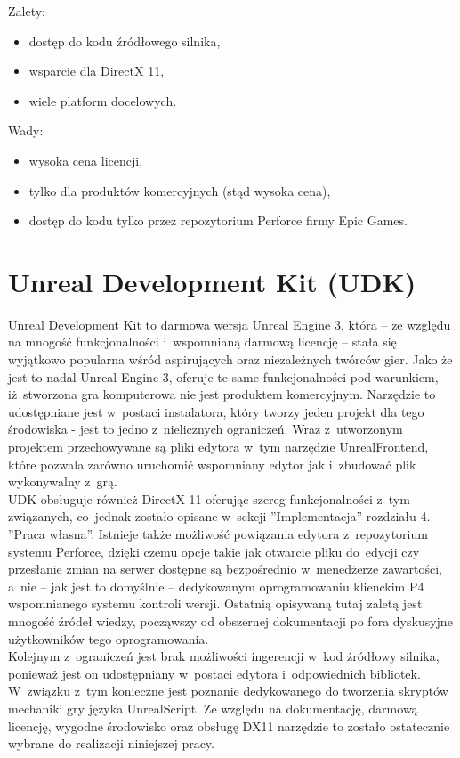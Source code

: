{\raggedright Zalety:
\begin{itemize}
\item dostęp do kodu źródłowego silnika,
\item wsparcie dla DirectX 11,
\item wiele platform docelowych.
\end{itemize}

Wady:
\begin{itemize}
\item wysoka cena licencji,
\item tylko dla produktów komercyjnych (stąd wysoka cena),
\item dostęp do kodu tylko przez repozytorium Perforce firmy Epic Games.
\end{itemize}
}

\section{Unreal Development Kit (UDK)}

Unreal Development Kit to darmowa wersja Unreal Engine 3, która -- ze względu na mnogość funkcjonalności i~wspomnianą darmową licencję -- stała się wyjątkowo popularna wśród aspirujących oraz niezależnych twórców gier. Jako że jest to nadal Unreal Engine 3, oferuje te same funkcjonalności pod warunkiem, iż~stworzona gra komputerowa nie jest produktem komercyjnym. Narzędzie to udostępniane jest w~postaci instalatora, który tworzy jeden projekt dla tego środowiska - jest to jedno z~nielicznych ograniczeń. Wraz z~utworzonym projektem przechowywane są pliki edytora w~tym narzędzie UnrealFrontend, które pozwala zarówno uruchomić wspomniany edytor jak i~zbudować plik wykonywalny z~grą.\\
UDK obsługuje również DirectX 11 oferując szereg funkcjonalności z~tym związanych, co~jednak zostało opisane w~sekcji ''Implementacja'' rozdziału 4. ''Praca własna''. Istnieje także możliwość powiązania edytora z~repozytorium systemu Perforce, dzięki czemu opcje takie jak otwarcie pliku do~edycji czy przesłanie zmian na serwer dostępne są bezpośrednio w~menedżerze zawartości, a~nie -- jak jest to domyślnie -- dedykowanym oprogramowaniu klienckim P4 wspomnianego systemu kontroli wersji. Ostatnią opisywaną tutaj zaletą jest mnogość źródeł wiedzy, począwszy od obszernej dokumentacji po fora dyskusyjne użytkowników tego oprogramowania.\\
Kolejnym z~ograniczeń jest brak możliwości ingerencji w~kod źródłowy silnika, ponieważ jest on udostępniany w~postaci edytora i~odpowiednich bibliotek. W~związku z~tym konieczne jest poznanie dedykowanego do tworzenia skryptów mechaniki gry języka UnrealScript.
Ze względu na dokumentację, darmową licencję, wygodne środowisko oraz obsługę DX11 narzędzie to zostało ostatecznie wybrane do realizacji niniejszej pracy.\\

